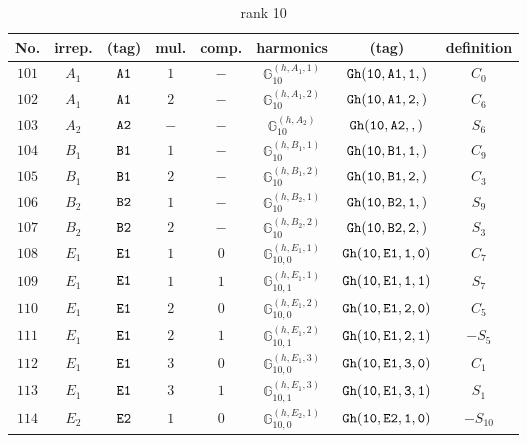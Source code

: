 \documentclass[fleqn,8pt]{jsarticle}
\begin{document}
\begin{table}[ht!]
\begin{center}
\caption{rank 10}
\renewcommand{\arraystretch}{1.3}
\begin{tabular}{cccccccc} \hline \hline
No. & irrep. & (tag) & mul. & comp. & harmonics & (tag) & definition \\ \hline
$ 101 $ & $ A_{1} $ & $ {\tt A1} $ & $ 1 $ & $ - $ & $ \mathbb{G}_{10}^{(h,A_{1},1)} $ & $ {\tt Gh(10,A1,1,)} $ & $ C_{0} $ \\
$ 102 $ & $ A_{1} $ & $ {\tt A1} $ & $ 2 $ & $ - $ & $ \mathbb{G}_{10}^{(h,A_{1},2)} $ & $ {\tt Gh(10,A1,2,)} $ & $ C_{6} $ \\
$ 103 $ & $ A_{2} $ & $ {\tt A2} $ & $ - $ & $ - $ & $ \mathbb{G}_{10}^{(h,A_{2})} $ & $ {\tt Gh(10,A2,,)} $ & $ S_{6} $ \\
$ 104 $ & $ B_{1} $ & $ {\tt B1} $ & $ 1 $ & $ - $ & $ \mathbb{G}_{10}^{(h,B_{1},1)} $ & $ {\tt Gh(10,B1,1,)} $ & $ C_{9} $ \\
$ 105 $ & $ B_{1} $ & $ {\tt B1} $ & $ 2 $ & $ - $ & $ \mathbb{G}_{10}^{(h,B_{1},2)} $ & $ {\tt Gh(10,B1,2,)} $ & $ C_{3} $ \\
$ 106 $ & $ B_{2} $ & $ {\tt B2} $ & $ 1 $ & $ - $ & $ \mathbb{G}_{10}^{(h,B_{2},1)} $ & $ {\tt Gh(10,B2,1,)} $ & $ S_{9} $ \\
$ 107 $ & $ B_{2} $ & $ {\tt B2} $ & $ 2 $ & $ - $ & $ \mathbb{G}_{10}^{(h,B_{2},2)} $ & $ {\tt Gh(10,B2,2,)} $ & $ S_{3} $ \\
$ 108 $ & $ E_{1} $ & $ {\tt E1} $ & $ 1 $ & $ 0 $ & $ \mathbb{G}_{10,0}^{(h,E_{1},1)} $ & $ {\tt Gh(10,E1,1,0)} $ & $ C_{7} $ \\
$ 109 $ & $ E_{1} $ & $ {\tt E1} $ & $ 1 $ & $ 1 $ & $ \mathbb{G}_{10,1}^{(h,E_{1},1)} $ & $ {\tt Gh(10,E1,1,1)} $ & $ S_{7} $ \\
$ 110 $ & $ E_{1} $ & $ {\tt E1} $ & $ 2 $ & $ 0 $ & $ \mathbb{G}_{10,0}^{(h,E_{1},2)} $ & $ {\tt Gh(10,E1,2,0)} $ & $ C_{5} $ \\
$ 111 $ & $ E_{1} $ & $ {\tt E1} $ & $ 2 $ & $ 1 $ & $ \mathbb{G}_{10,1}^{(h,E_{1},2)} $ & $ {\tt Gh(10,E1,2,1)} $ & $ - S_{5} $ \\
$ 112 $ & $ E_{1} $ & $ {\tt E1} $ & $ 3 $ & $ 0 $ & $ \mathbb{G}_{10,0}^{(h,E_{1},3)} $ & $ {\tt Gh(10,E1,3,0)} $ & $ C_{1} $ \\
$ 113 $ & $ E_{1} $ & $ {\tt E1} $ & $ 3 $ & $ 1 $ & $ \mathbb{G}_{10,1}^{(h,E_{1},3)} $ & $ {\tt Gh(10,E1,3,1)} $ & $ S_{1} $ \\
$ 114 $ & $ E_{2} $ & $ {\tt E2} $ & $ 1 $ & $ 0 $ & $ \mathbb{G}_{10,0}^{(h,E_{2},1)} $ & $ {\tt Gh(10,E2,1,0)} $ & $ - S_{10} $ \\

\end{tabular}
\end{center}
\end{table}
\end{document}
